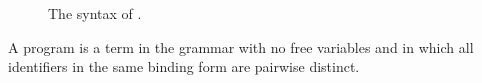 \documentclass{sigplanconf}
\begin{document}
\begin{figure}

\caption{The syntax of \chapcalc.}
\end{figure}

A program is a term in the grammar with no free variables and in which all identifiers in the same binding form are pairwise distinct.






\end{document}
